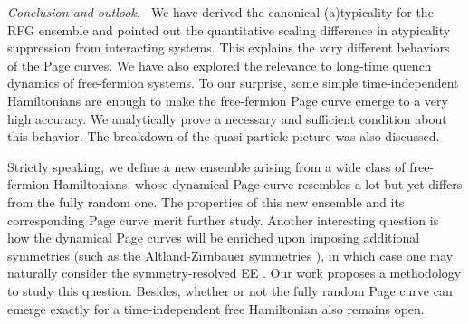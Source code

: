 \documentclass[twocolumn,english,prl,aps,superscriptaddress,amsmath,amssymb,floatfix]{revtex4-2}
\begin{document}
\emph{Conclusion and outlook.--}%
We have derived the canonical
(a)typicality for the RFG ensemble %
and pointed out the quantitative %
scaling difference in atypicality suppression %
from %
interacting systems. This %
explains the very different behaviors of the Page curves. %
We have also explored the relevance to long-time quench dynamics of %
free-fermion systems. %
To our surprise, some simple time-independent
Hamiltonians are enough to 
make %
the free-fermion Page curve %
emerge to a very high accuracy. 
We %
analytically prove a necessary and sufficient condition about this behavior. The breakdown %
of the quasi-particle picture was also discussed.

Strictly speaking, we define a new %
ensemble arising from %
a wide class of free-fermion Hamiltonians, whose dynamical Page curve resembles a lot but yet differs from %
the fully random one. %
The properties of this new ensemble and its corresponding Page curve %
merit further study. Another interesting question is how the %
dynamical Page curves will be enriched upon imposing %
additional symmetries (such as the Altland-Zirnbauer symmetries \cite{Altland1997}), in which case one may naturally consider %
the symmetry-resolved EE %
\citep{PhysRevD.106.046015,Lau2022}. %
Our work proposes a methodology to study this question. Besides, whether
or not the fully random Page curve can emerge exactly for a time-independent free Hamiltonian %
also remains open.
\end{document}
